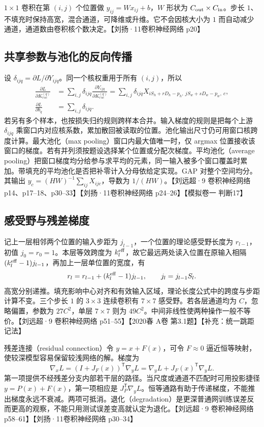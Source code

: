 \documentclass[UTF8,a4paper,zihao=-4,fontset=fandol]{ctexrep}
\begin{document}
$1\times1$ 卷积在第 $(i,j)$ 个位置做 $y_{ij}=Wx_{ij}+b$，$W$ 形状为 $C_{\rm out}\times C_{\rm in}$。步长 $1$、不填充时保持高宽，混合通道，可降维或升维。它不会因核大小为 $1$ 而自动减少通道，通道数由卷积核个数决定。【刘扬·11卷积神经网络 p20】

\subsection*{共享参数与池化的反向传播}

设 $\delta_{ijq}=\partial L/\partial Y_{ijq}$。同一个核权重用于所有 $(i,j)$，所以
\begin{align*}
 \frac{\partial L}{\partial K^{(q)}_{rsc}}
 &=\sum_{i,j}\delta_{ijq}
   \frac{\partial Y_{ijq}}{\partial K^{(q)}_{rsc}}
 =\sum_{i,j}\delta_{ijq} X_{iS_h+rD_h-p_h,\ jS_w+sD_w-p_w,\ c},\\
 \frac{\partial L}{\partial b_q}&=\sum_{i,j}\delta_{ijq}.
\end{align*}
若另有多个样本，也按损失归约规则跨样本合并。输入梯度的规则是把每个上游 $\delta_{ijq}$ 乘窗口内对应核系数，累加散回被读取的位置。池化输出尺寸仍可用窗口核跨度计算。最大池化（max pooling）窗口内最大值唯一时，仅 argmax 位置接收该窗口的梯度。若有并列须按题设选择某个位置或分配次梯度。平均池化（average pooling）把窗口梯度均分给参与求平均的元素，同一输入被多个窗口覆盖时累加。带填充的平均池化是否把补零计入分母依给定实现。GAP 对整个空间均分。其输出 $y_c=(HW)^{-1}\sum_{ij}X_{ijc}$，导数为 $1/(HW)$。【刘远超·9 卷积神经网络 p14、p17--18、p30--33】【刘扬·11卷积神经网络 p24--26】【模拟卷一 判断17】

\subsection*{感受野与残差梯度}

记上一层相邻两个位置的输入步距为 $j_{l-1}$，一个位置的理论感受野长度为 $r_{l-1}$，初值 $j_0=r_0=1$。本层等效跨度为 $k_l^{\rm eff}$，故它最远两处读入位置在原输入相隔 $(k_l^{\rm eff}-1)j_{l-1}$，再加上一层单位置的宽度，有
\[
 r_l=r_{l-1}+(k_l^{\rm eff}-1)j_{l-1},\qquad
 j_l=j_{l-1}S_l .
\]
高宽分别递推。填充影响中心对齐和有效输入区域，理论长度公式中的跨度与步距计算不变。三个步长 $1$ 的 $3\times3$ 连续卷积有 $7\times7$ 感受野。若各层通道均为 $C$，忽略偏置，参数为 $27C^2$，单层 $7\times7$ 则为 $49C^2$。中间非线性使两种操作一般不等价。【刘远超·9 卷积神经网络 p51--55】【2020春 A卷 第3.1题】【补充：统一跳距记法】

残差连接（residual connection）令 $y=x+F(x)$，可令 $F\approx0$ 逼近恒等映射，使较深模型容易保留较浅网络的解。梯度为
\[
 \nabla_x L=(I+J_F(x))^{\mathsf T}\nabla_y L
 =\nabla_y L+J_F(x)^{\mathsf T}\nabla_y L.
\]
第一项提供不经残差分支内部若干层的路径。当尺度或通道不匹配时可用投影捷径 $y=P(x)+F(x)$，第一项相应是 $J_P^{\mathsf T}\nabla_yL$。恒等通路有助于传递梯度，不能推出梯度永远不衰减。两项可抵消。退化（degradation）是更深普通网训练误差反而更高的观察，不能只用测试误差变高就认定为退化。【刘远超·9 卷积神经网络 p58--61】【刘扬·11卷积神经网络 p30--34】
\end{document}
